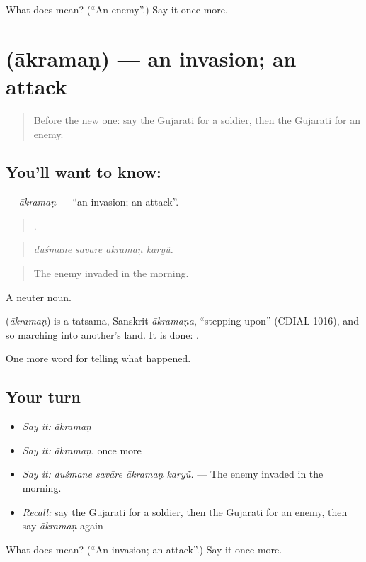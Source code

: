 \begin{tcolorbox}[breakable,colback=teal!4,colframe=teal!35!black,title={Before you move on}]
What does  mean? (\textquotedblleft{}An enemy\textquotedblright{}.) Say it once more.
\end{tcolorbox}
\section[\texorpdfstring{\gu{આક્રમણ} (ākramaṇ)}{આક્રમણ (ākramaṇ)}]{ (ākramaṇ) — an invasion; an attack}

\label{lesson:GU-C320-akraman}



\begin{quote}
Before the new one: say the Gujarati for a soldier, then the Gujarati for an enemy.
\end{quote}

\subsection*{You'll want to know: }
\textbf{} — \emph{ākramaṇ} — \textquotedblleft{}an invasion; an attack\textquotedblright{}.

\begin{quote}
   .
\end{quote}

\begin{quote}
\emph{duśmane savāre ākramaṇ karyũ.}
\end{quote}

\begin{quote}
The enemy invaded in the morning.
\end{quote}

A neuter noun.

\begin{cousinweb}
\textbf{} (\emph{ākramaṇ}) is a tatsama, Sanskrit \emph{ākramaṇa}, \textquotedblleft{}stepping upon\textquotedblright{} (CDIAL 1016), and so marching into another's land. It is done: \textbf{ }.
\end{cousinweb}

\begin{grammarlens}[title={What you've built}]
One more word for telling what happened.
\end{grammarlens}

\subsection*{Your turn}
\begin{itemize}
\raggedright
  \item \emph{Say it:} \emph{ākramaṇ}
  \item \emph{Say it:} \emph{ākramaṇ}, once more
  \item \emph{Say it:} \emph{duśmane savāre ākramaṇ karyũ.} — The enemy invaded in the morning.
  \item \emph{Recall:} say the Gujarati for a soldier, then the Gujarati for an enemy, then say \emph{ākramaṇ} again
\end{itemize}

\begin{tcolorbox}[breakable,colback=teal!4,colframe=teal!35!black,title={Before you move on}]
What does  mean? (\textquotedblleft{}An invasion; an attack\textquotedblright{}.) Say it once more.
\end{tcolorbox}
